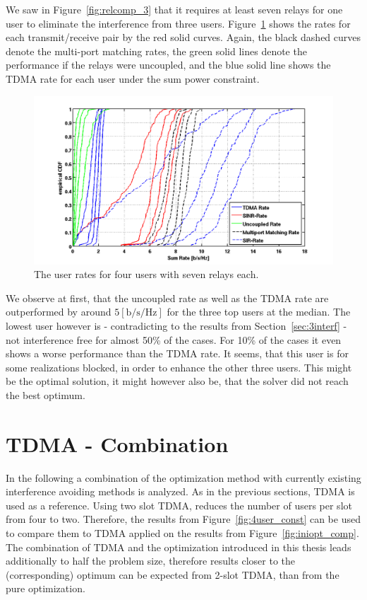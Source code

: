 We saw in Figure~\ref{fig:relcomp_3} that it requires at least seven relays for one user to eliminate the interference from three users.
Figure~\ref{fig:4user_userrate} shows the rates for each transmit/receive pair by the red solid curves.
Again, the black dashed curves denote the multi-port matching rates, the green solid lines denote the performance if the relays were uncoupled, and the blue solid line shows the TDMA rate for each user under the sum power constraint.
\begin{figure}[h]
\centering
  \includegraphics[width=\linewidth]{images/4user_userrate.png}
\caption{The user rates for  four users with seven relays each.}
\label{fig:4user_userrate}
\end{figure}

We observe at first, that the uncoupled rate as well as the TDMA rate are outperformed by around $5 \left[\text{b/s/Hz}\right]$ for the three top users at the median.
The lowest user however is - contradicting to the results from Section~\ref{sec:3interf} - not interference free for almost 50\% of the cases.
For 10\% of the cases it even shows a worse performance than the TDMA rate.
It seems, that this user is for some realizations blocked, in order to enhance the other three users.
This might be the optimal solution, it might however also be, that the solver did not reach the best optimum.


\section{TDMA - Combination}
\label{sec:tdma_combination}

In the following a combination of the optimization method with currently existing interference avoiding methods is analyzed.
As in the previous sections, TDMA is used as a reference.
Using two slot TDMA, reduces the number of users per slot from four to two.
Therefore, the results from Figure~\ref{fig:4user_const} can be used to compare them to TDMA applied on the results from Figure~\ref{fig:iniopt_comp}.
The combination of TDMA and the optimization introduced in this thesis leads additionally to half the problem size, therefore results closer to the (corresponding) optimum can be expected from 2-slot TDMA, than from the pure optimization.

